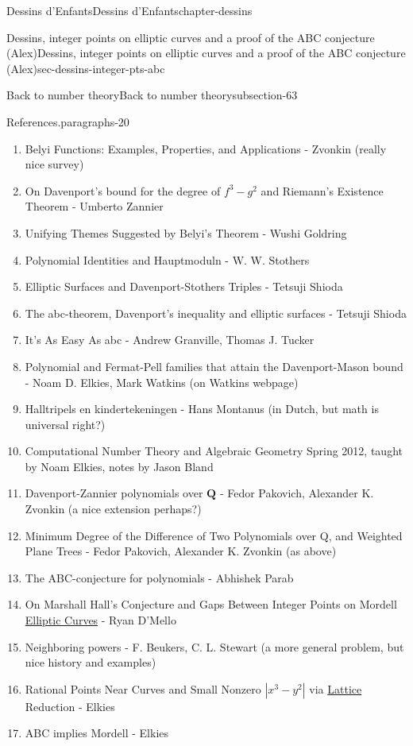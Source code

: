 \documentclass[oneside,10pt,]{book}
\numberwithin{equation}{section}
\newcommand{\QQ}{\mathbf{Q}}
\begin{document}
\begin{chapterptx}{Dessins d'Enfants}{}{Dessins d'Enfants}{}{}{chapter-dessins}
\begin{sectionptx}{Dessins, integer points on elliptic curves and a proof of the ABC conjecture (Alex)}{}{Dessins, integer points on elliptic curves and a proof of the ABC conjecture (Alex)}{}{}{sec-dessins-integer-pts-abc}
\begin{subsectionptx}{Back to number theory}{}{Back to number theory}{}{}{subsection-63}
\begin{paragraphs}{References.}{paragraphs-20}
\begin{enumerate}
\item\hypertarget{li-151}{}Belyi Functions: Examples, Properties, and Applications - Zvonkin (really nice survey)%
\item\hypertarget{li-152}{}On Davenport’s bound for the degree of \(f^3 - g^2\) and Riemann's Existence Theorem - Umberto Zannier%
\item\hypertarget{li-153}{}Unifying Themes Suggested by Belyi's Theorem - Wushi Goldring%
\item\hypertarget{li-154}{}Polynomial Identities and Hauptmoduln - W. W. Stothers%
\item\hypertarget{li-155}{}Elliptic Surfaces and Davenport-Stothers Triples -  Tetsuji Shioda%
\item\hypertarget{li-156}{}The abc-theorem, Davenport’s inequality and elliptic surfaces - Tetsuji Shioda%
\item\hypertarget{li-157}{}It's As Easy As abc -  Andrew Granville, Thomas J. Tucker%
\item\hypertarget{li-158}{}Polynomial and Fermat-Pell families that attain the Davenport-Mason bound - Noam D. Elkies, Mark Watkins (on Watkins webpage)%
\item\hypertarget{li-159}{}Halltripels en kindertekeningen - Hans Montanus (in Dutch, but math is universal right?)%
\item\hypertarget{li-160}{}Computational Number Theory and Algebraic Geometry Spring 2012, taught by Noam Elkies, notes by Jason Bland%
\item\hypertarget{li-161}{}Davenport-Zannier polynomials over \(\QQ\) - Fedor Pakovich, Alexander K. Zvonkin (a nice extension perhaps?)%
\item\hypertarget{li-162}{}Minimum Degree of the Difference of Two Polynomials over Q, and Weighted Plane Trees -  Fedor Pakovich,  Alexander K. Zvonkin (as above)%
\item\hypertarget{li-163}{}The ABC-conjecture for polynomials - Abhishek Parab%
\item\hypertarget{li-164}{}On Marshall Hall's Conjecture and Gaps Between Integer Points on Mordell \hyperref[def-supersing-isog-ec]{Elliptic Curves} - Ryan D'Mello%
\item\hypertarget{li-165}{}Neighboring powers - F. Beukers, C. L. Stewart (a more general problem, but nice history and examples)%
\item\hypertarget{li-166}{}Rational Points Near Curves and Small Nonzero \(| x^3 - y^2|\) via \hyperref[def-buntes-lattice]{Lattice} Reduction - Elkies%
\item\hypertarget{li-167}{}ABC implies Mordell - Elkies%

\end{enumerate}
\end{paragraphs}
\end{subsectionptx}
\end{sectionptx}
\end{chapterptx}
\end{document}
